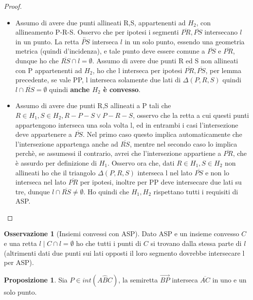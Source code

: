 \documentclass[a4paper,10pt]{article}
\theoremstyle{definition}
\theoremstyle{indentdefinition}
\theoremstyle{indentpostulate}
\theoremstyle{indenttheorem}
\newtheorem{prop}{Proposizione}[section]
\theoremstyle{myremark}
\newtheorem*{rem*}{Osservazione}
\theoremstyle{indentgeneral}
\begin{document}
\begin{proof}
\begin{itemize}
\begin{itemize}
    \item Assumo di avere due punti allineati R,S, appartenenti ad $H_2$, con allineamento P-R-S. Osservo che per ipotesi i segmenti $\overline{PR}, \overline{PS}$ intersecano $l$ in un punto. La retta $\overleftrightarrow{PS}$ interseca $l$ in un solo punto, essendo una geometria metrica (quindi d'incidenza), e tale punto deve essere comune a $\overline{PS}$ e $\overline{PR}$, dunque ho che $\overline{RS} \cap l = \emptyset$. Assumo di avere due punti R ed S  non allineati con P appartenenti ad $H_2$, ho che l interseca per ipotesi $\overline{PR},\overline{PS}$, per lemma precedente, se vale PP, l interseca solamente due lati di $\Delta (P,R,S)$ quindi $l \cap \overline{RS} = \emptyset$ quindi \textbf{anche $H_2$ è convesso}. 
    \item Assumo di avere due punti R,S allineati a P tali che $R \in H_1, S \in H_2, R-P-S \lor P-R-S$, osservo che la retta a cui questi punti appartengono interseca una sola volta l, ed in entrambi i casi l'intersezione deve appartenere a $\overline{PS}$. Nel primo caso questo implica automaticamente che l'intersezione appartenga anche ad $\overline{RS}$, mentre nel secondo caso lo implica perchè, se assumessi il contrario, avrei che l'intersezione appartiene a $\overline{PR}$, che è assurdo per definizione di $H_1$. Osservo ora che, dati $R \in H_1, S \in H_2$ non allineati ho che il triangolo $\Delta (P,R,S)$ interseca l nel lato $\overline{PS}$ e non lo interseca nel lato $\overline{PR}$ per ipotesi, inoltre per PP deve intersecare due lati su tre, dunque $l \cap \overline{RS} \neq \emptyset$. Ho quindi che $H_1,H_2$ rispettano tutti i requisiti di ASP. 
    \end{itemize}
    \end{itemize}
\end{proof}



\begin{rem*}[Insiemi convessi con ASP]
    Dato ASP e un insieme convesso $C$ e una retta $l\mid C \cap l = \emptyset$ ho che tutti i punti di $C$ si trovano dalla stessa parte di $l$ (altrimenti dati due punti sui lati opposti il loro segmento dovrebbe intersecare l per ASP).
\end{rem*} 

\begin{prop}    Sia $P \in int(A \hat{B} C)$, la semiretta $\overrightarrow{BP}$ interseca $\overline{AC}$ in uno e un solo punto.  \end{prop} 
\end{document}
